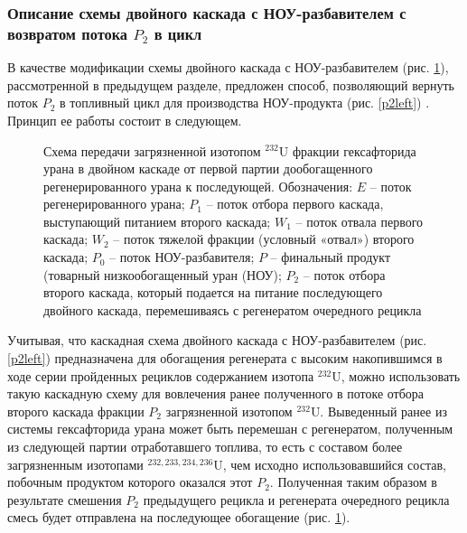 \subsubsection{Описание схемы двойного каскада с НОУ-разбавителем с возвратом потока $P_2$ в цикл}

В качестве модификации схемы двойного каскада с НОУ-разбавителем (рис. \ref{P2utilizationRing}), рассмотренной в предыдущем разделе, предложен способ, позволяющий вернуть поток $P_2$ в топливный цикл для производства НОУ-продукта (рис. \ref{p2left}) \cite{nevinicaToplivnyyCiklLegkovodnogo2019, nevinicaSposobIzotopnogoVosstanovleniya2019}. Принцип ее работы состоит в следующем.

\begin{figure}[ht]
    \caption{Схема передачи загрязненной изотопом $^{232}$U фракции гексафторида урана в двойном каскаде от первой партии дообогащенного регенерированного урана к последующей. Обозначения: $E$ -- поток регенерированного урана; $P_1$ -- поток отбора первого каскада, выступающий питанием второго каскада; $W_1$ -- поток отвала первого каскада; $W_2$ -- поток тяжелой фракции (условный «отвал») второго каскада; $P_0$ -- поток НОУ-разбавителя; $P$ -- финальный продукт (товарный низкообогащенный уран (НОУ); $P_2$ -- поток отбора второго каскада, который подается на питание последующего двойного каскада, перемешиваясь с регенератом очередного рецикла}\label{P2utilizationRing}
\end{figure}

Учитывая, что каскадная схема двойного каскада с НОУ-разбавителем (рис. \ref{p2left}) предназначена для обогащения регенерата с высоким накопившимся в ходе серии пройденных рециклов содержанием изотопа $^{232}$U, можно использовать такую каскадную схему для вовлечения ранее полученного в потоке отбора второго каскада фракции $P_2$ загрязненной изотопом $^{232}$U. Выведенный ранее из системы гексафторида урана может быть перемешан с регенератом, полученным из следующей партии отработавшего топлива, то есть с составом более загрязненным изотопами $^{232,233,234,236}$U, чем исходно использовавшийся состав, побочным продуктом которого оказался этот $P_2$. Полученная таким образом в результате смешения $P_2$ предыдущего рецикла и регенерата очередного рецикла смесь будет отправлена на последующее обогащение (рис. \ref{P2utilizationRing}).

